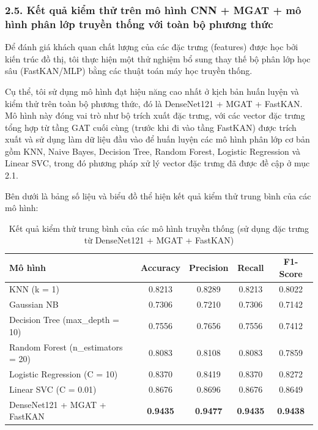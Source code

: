 \subsubsection{2.5. Kết quả kiểm thử trên mô hình CNN + MGAT + mô hình phân lớp truyền thống với toàn bộ phương thức}
\indent\indent Để đánh giá khách quan chất lượng của các đặc trưng (features) được học bởi kiến trúc đồ thị, tôi thực hiện một thử nghiệm bổ sung thay thế bộ phân lớp học sâu (FastKAN/MLP) bằng các thuật toán máy học truyền thống.\vspace{0.3cm}

Cụ thể, tôi sử dụng mô hình đạt hiệu năng cao nhất ở kịch bản huấn luyện và kiểm thử trên toàn bộ phương thức, đó là DenseNet121 + MGAT + FastKAN. Mô hình này đóng vai trò như bộ trích xuất đặc trưng, với các vector đặc trưng tổng hợp từ tầng GAT cuối cùng (trước khi đi vào tầng FastKAN) được trích xuất và sử dụng làm dữ liệu đầu vào để huấn luyện các mô hình phân lớp cơ bản gồm KNN, Naive Bayes, Decision Tree, Random Forest, Logistic Regression và Linear SVC, trong đó phương pháp xử lý vector đặc trưng đã được đề cập ở mục 2.1.\vspace{0.3cm}

Bên dưới là bảng số liệu và biểu đồ thể hiện kết quả kiểm thử trung bình của các mô hình:
\begin{table}[H]
\centering
\caption{\centering Kết quả kiểm thử trung bình của các mô hình truyền thống (sử dụng đặc trưng từ DenseNet121 + MGAT + FastKAN)}
\label{tab:TraditionalModelsSummary}
\renewcommand{\arraystretch}{1.15}
\begin{tabular}{lcccc}
\hline
\textbf{Mô hình} & \textbf{Accuracy} & \textbf{Precision} & \textbf{Recall} & \textbf{F1-Score} \\
\hline
KNN (k = 1)                   & 0.8213 & 0.8289 & 0.8213 & 0.8022 \\
Gaussian NB                   & 0.7306 & 0.7210 & 0.7306 & 0.7142 \\
Decision Tree (max\_depth = 10) & 0.7556 & 0.7656 & 0.7556 & 0.7412 \\
Random Forest (n\_estimators = 20) & 0.8083 & 0.8108 & 0.8083 & 0.7859 \\
Logistic Regression (C = 10)      & 0.8370 & 0.8419 & 0.8370 & 0.8272 \\
Linear SVC (C = 0.01)             & 0.8676 & 0.8696 & 0.8676 & 0.8649 \\
\hline
{DenseNet121 + MGAT + FastKAN} & \textbf{0.9435} & \textbf{0.9477} & \textbf{0.9435} & \textbf{0.9438} \\
\hline
\end{tabular}
\end{table}

